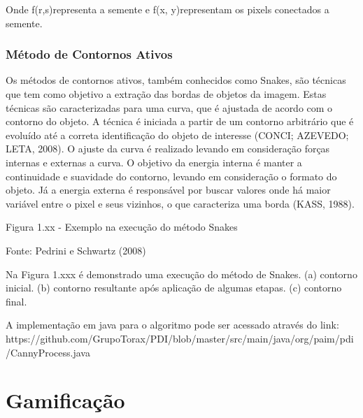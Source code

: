 \documentclass[
	12pt,				%
	oneside,			%
	a4paper,			%
	english,			%
	french,				%
	spanish,			%
	brazil,				%
	]{abntex2}
\begin{document}
	Onde f(r,s)representa a semente e f(x, y)representam os pixels conectados a semente.
    
\subsection{Método de Contornos Ativos}     

	Os métodos de contornos ativos, também conhecidos como Snakes, são técnicas que tem como objetivo a extração das bordas de objetos da imagem. Estas técnicas são caracterizadas para uma curva, que é ajustada de acordo com o contorno do objeto. A técnica é iniciada a partir de um contorno arbitrário que é evoluído até a correta identificação do objeto de interesse (CONCI; AZEVEDO; LETA, 2008).
	O ajuste da curva é realizado levando em consideração forças internas e externas a curva. O objetivo da energia interna é manter a continuidade e suavidade do contorno, levando em consideração o formato do objeto. Já a energia externa é responsável por buscar valores onde há maior variável entre o pixel e seus vizinhos, o que caracteriza uma borda (KASS, 1988).

Figura 1.xx - Exemplo na execução do método Snakes

Fonte: Pedrini e Schwartz (2008)	

	Na Figura 1.xxx é demonstrado uma execução do método de Snakes. (a) contorno inicial. (b) contorno resultante após aplicação de algumas etapas. (c) contorno final.

A implementação em java para o algoritmo pode ser acessado através do link:
https://github.com/GrupoTorax/PDI/blob/master/src/main/java/org/paim/pdi/CannyProcess.java 

\chapter{Gamificação}
\end{document}
